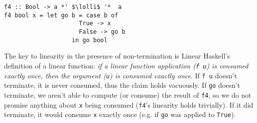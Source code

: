 \documentclass[acmsmall,review,anonymous,screen]{acmart}
\newcommand{\incode}[1]{\lstinline{#1}}
\newcommand{\lolli}{\multimap}
\begin{document}
\begin{notyet}
\begin{lstlisting}
f4 :: Bool -> a *' $\lolli$ '*  a
f4 bool x = let go b = case b of
                     True -> x
                     False -> go b
                   in go bool
          \end{lstlisting}
        \end{notyet}

The key to linearity in the presence of non-termination is Linear Haskell's
definition of a linear function: \emph{if a linear function application (\incode{f u}) is
consumed exactly once, then the argument (\incode{u}) is consumed exactly once}.
If \incode{f u} doesn't terminate, it is never consumed, thus the claim holds
vacuously.
%
If \incode{go} doesn't terminate, we aren't able to compute (or consume) the result
of \incode{f4}, so we do not promise anything about \incode{x} being consumed (\incode{f4}'s
linearity holds trivially). If it did terminate, it would consume \incode{x} exactly
once (e.g. if \incode{go} was applied to \incode{True}).
\end{document}
